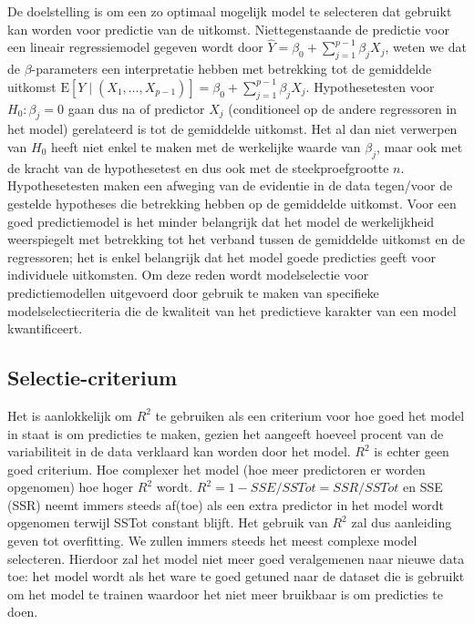 \documentclass[12pt,dutch,coursenotes]{book}
\theoremstyle{definition}
\theoremstyle{definition}
\theoremstyle{definition}
\theoremstyle{remark}
\begin{document}
De doelstelling is om een zo optimaal mogelijk model te selecteren dat
gebruikt kan worden voor predictie van de uitkomst. Niettegenstaande de
predictie voor een lineair regressiemodel gegeven wordt door
\(\hat{Y}=\beta_0+\sum_{j=1}^{p-1}\beta_jX_j\), weten we dat de
\(\beta\)-parameters een interpretatie hebben met betrekking tot de
gemiddelde uitkomst
\(\text{E}[Y\mid (X_1,\ldots,X_{p-1})]=\beta_0+\sum_{j=1}^{p-1}\beta_jX_j\).
Hypothesetesten voor \(H_0:\beta_j=0\) gaan dus na of predictor \(X_j\)
(conditioneel op de andere regressoren in het model) gerelateerd is tot
de gemiddelde uitkomst. Het al dan niet verwerpen van \(H_0\) heeft niet
enkel te maken met de werkelijke waarde van \(\beta_j\), maar ook met de
kracht van de hypothesetest en dus ook met de steekproefgrootte \(n\).
Hypothesetesten maken een afweging van de evidentie in de data
tegen/voor de gestelde hypotheses die betrekking hebben op de gemiddelde
uitkomst. Voor een goed predictiemodel is het minder belangrijk dat het
model de werkelijkheid weerspiegelt met betrekking tot het verband
tussen de gemiddelde uitkomst en de regressoren; het is enkel belangrijk
dat het model goede predicties geeft voor individuele uitkomsten. Om
deze reden wordt modelselectie voor predictiemodellen uitgevoerd door
gebruik te maken van specifieke modelselectiecriteria die de kwaliteit
van het predictieve karakter van een model kwantificeert.

\subsection{Selectie-criterium}\label{selectie-criterium}

Het is aanlokkelijk om \(R^2\) te gebruiken als een criterium voor hoe
goed het model in staat is om predicties te maken, gezien het aangeeft
hoeveel procent van de variabiliteit in de data verklaard kan worden
door het model. \(R^2\) is echter geen goed criterium. Hoe complexer het
model (hoe meer predictoren er worden opgenomen) hoe hoger \(R^2\)
wordt. \(R^2 = 1-SSE/SSTot = SSR/SSTot\) en SSE (SSR) neemt immers
steeds af(toe) als een extra predictor in het model wordt opgenomen
terwijl SSTot constant blijft. Het gebruik van \(R^2\) zal dus
aanleiding geven tot overfitting. We zullen immers steeds het meest
complexe model selecteren. Hierdoor zal het model niet meer goed
veralgemenen naar nieuwe data toe: het model wordt als het ware te goed
getuned naar de dataset die is gebruikt om het model te trainen waardoor
het niet meer bruikbaar is om predicties te doen.
\end{document}
